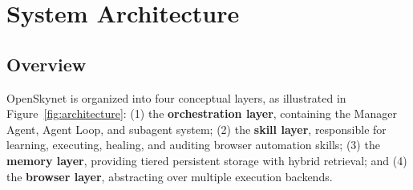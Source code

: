 \section{System Architecture}
\label{sec:architecture}

\subsection{Overview}

OpenSkynet is organized into four conceptual layers, as illustrated in Figure~\ref{fig:architecture}: (1) the \textbf{orchestration layer}, containing the Manager Agent, Agent Loop, and subagent system; (2) the \textbf{skill layer}, responsible for learning, executing, healing, and auditing browser automation skills; (3) the \textbf{memory layer}, providing tiered persistent storage with hybrid retrieval; and (4) the \textbf{browser layer}, abstracting over multiple execution backends.

